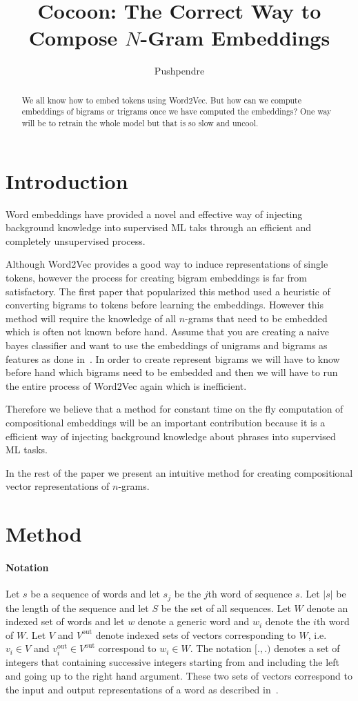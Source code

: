 \documentclass{article}
\title{Cocoon: The Correct Way to Compose $N$-Gram Embeddings}
\author{Pushpendre}
\newcommand{\Vo}{V^{\textrm{out}}}
\newcommand{\vo}[1]{v^{\textrm{out}}_{#1}}
\newcommand{\wv}{Word2Vec\xspace}
\begin{document}
\maketitle
\begin{abstract}
We all know how to embed tokens using \wv. But how can we compute
embeddings of bigrams or trigrams once we have computed the embeddings?
One way will be to retrain the whole model but that is so slow and uncool.

\end{abstract}
\section{Introduction}
\label{sec:introduction}
Word embeddings have provided a novel and effective way of injecting background
knowledge into supervised ML taks through an efficient and completely
unsupervised process.

Although \wv provides a good way to induce representations of single
tokens, however the process for creating bigram embeddings is far from
satisfactory. The first paper that popularized this method used a heuristic of
converting bigrams to tokens before learning the embeddings. However this method
will require the knowledge of all $n$-grams that need to be embedded which is
often not known before hand. Assume that you are creating a naive bayes
classifier and want to use the embeddings of unigrams and bigrams as features as
done in~\cite{wang2012baselines}. In order to create represent bigrams we
will have to know before hand which bigrams need to be embedded and then we will
have to run the entire process of \wv again which is inefficient.

Therefore we believe that a method for constant time on the fly computation of
compositional embeddings will be an important contribution because it is a efficient
way of injecting background knowledge about phrases into supervised ML tasks.

In the rest of the paper we present an intuitive method for creating compositional vector
representations of $n$-grams.

\section{Method}
\label{sec:method}
\paragraph{Notation} Let $s$ be a sequence of words and let $s_j$ be the $j$th word of sequence $s$.
Let $|s|$ be the length of the sequence and let $S$ be the set of all sequences.
Let $W$ denote an indexed set of words and
let $w$ denote a generic word and $w_i$ denote the $i$th word of $W$.
Let $V$ and $\Vo$ denote indexed sets of vectors corresponding to $W$,
i.e. $v_i \in V$ and $\vo{i} \in \Vo$ correspond to $w_i \in W$. The notation
$[., .)$ denotes a set of integers that containing successive integers starting
from and including the left  and going up to the right hand argument.
These two sets
of vectors correspond to the input and output representations of a word as
described in~\cite{mikolov2013distributed}.
\end{document}
